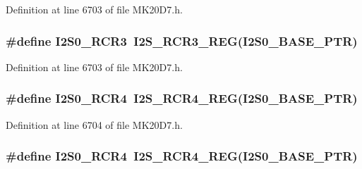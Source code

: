 Definition at line 6703 of file M\+K20\+D7.\+h.

\subsubsection[{\texorpdfstring{I2\+S0\+\_\+\+R\+C\+R3}{I2S0_RCR3}}]{\setlength{\rightskip}{0pt plus 5cm}\#define I2\+S0\+\_\+\+R\+C\+R3~{\bf I2\+S\+\_\+\+R\+C\+R3\+\_\+\+R\+EG}({\bf I2\+S0\+\_\+\+B\+A\+S\+E\+\_\+\+P\+TR})}\hypertarget{group___i2_s___register___accessor___macros_gad68233bf05ad7d786ba95d1cf965ee45}{}\label{group___i2_s___register___accessor___macros_gad68233bf05ad7d786ba95d1cf965ee45}


Definition at line 6703 of file M\+K20\+D7.\+h.

\subsubsection[{\texorpdfstring{I2\+S0\+\_\+\+R\+C\+R4}{I2S0_RCR4}}]{\setlength{\rightskip}{0pt plus 5cm}\#define I2\+S0\+\_\+\+R\+C\+R4~{\bf I2\+S\+\_\+\+R\+C\+R4\+\_\+\+R\+EG}({\bf I2\+S0\+\_\+\+B\+A\+S\+E\+\_\+\+P\+TR})}\hypertarget{group___i2_s___register___accessor___macros_gac920c2084f1555a5696e637e5231ecfa}{}\label{group___i2_s___register___accessor___macros_gac920c2084f1555a5696e637e5231ecfa}


Definition at line 6704 of file M\+K20\+D7.\+h.

\subsubsection[{\texorpdfstring{I2\+S0\+\_\+\+R\+C\+R4}{I2S0_RCR4}}]{\setlength{\rightskip}{0pt plus 5cm}\#define I2\+S0\+\_\+\+R\+C\+R4~{\bf I2\+S\+\_\+\+R\+C\+R4\+\_\+\+R\+EG}({\bf I2\+S0\+\_\+\+B\+A\+S\+E\+\_\+\+P\+TR})}\hypertarget{group___i2_s___register___accessor___macros_gac920c2084f1555a5696e637e5231ecfa}{}\label{group___i2_s___register___accessor___macros_gac920c2084f1555a5696e637e5231ecfa}


